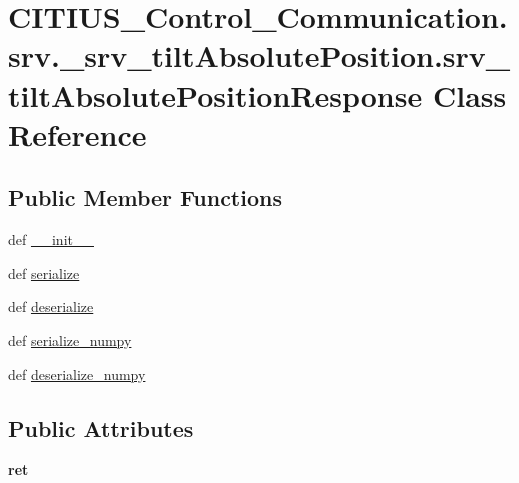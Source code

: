\hypertarget{class_c_i_t_i_u_s___control___communication_1_1srv_1_1__srv__tilt_absolute_position_1_1srv__tilt_absolute_position_response}{\section{\-C\-I\-T\-I\-U\-S\-\_\-\-Control\-\_\-\-Communication.\-srv.\-\_\-srv\-\_\-tilt\-Absolute\-Position.\-srv\-\_\-tilt\-Absolute\-Position\-Response \-Class \-Reference}
\label{class_c_i_t_i_u_s___control___communication_1_1srv_1_1__srv__tilt_absolute_position_1_1srv__tilt_absolute_position_response}
}
\subsection*{\-Public \-Member \-Functions}
\begin{DoxyCompactItemize}
\item 
def \hyperlink{class_c_i_t_i_u_s___control___communication_1_1srv_1_1__srv__tilt_absolute_position_1_1srv__tilt_absolute_position_response_a777f9b76332122b19af43627625c85c4}{\-\_\-\-\_\-init\-\_\-\-\_\-}
\item 
def \hyperlink{class_c_i_t_i_u_s___control___communication_1_1srv_1_1__srv__tilt_absolute_position_1_1srv__tilt_absolute_position_response_a6fa1cfa9ec6fd0c28ca950ffbad144fa}{serialize}
\item 
def \hyperlink{class_c_i_t_i_u_s___control___communication_1_1srv_1_1__srv__tilt_absolute_position_1_1srv__tilt_absolute_position_response_a58d84bd1ac2032b4b9dff3cdadf55c9b}{deserialize}
\item 
def \hyperlink{class_c_i_t_i_u_s___control___communication_1_1srv_1_1__srv__tilt_absolute_position_1_1srv__tilt_absolute_position_response_a49f392c4cc61ce97e4398c7bc6137512}{serialize\-\_\-numpy}
\item 
def \hyperlink{class_c_i_t_i_u_s___control___communication_1_1srv_1_1__srv__tilt_absolute_position_1_1srv__tilt_absolute_position_response_a048667a527d886aeb0a74107957fb61c}{deserialize\-\_\-numpy}
\end{DoxyCompactItemize}
\subsection*{\-Public \-Attributes}
\begin{DoxyCompactItemize}
\item 
\hypertarget{class_c_i_t_i_u_s___control___communication_1_1srv_1_1__srv__tilt_absolute_position_1_1srv__tilt_absolute_position_response_ac52e75b88b80c75a75eceacc44aab188}{{\bfseries ret}}\label{class_c_i_t_i_u_s___control___communication_1_1srv_1_1__srv__tilt_absolute_position_1_1srv__tilt_absolute_position_response_ac52e75b88b80c75a75eceacc44aab188}

\end{DoxyCompactItemize}
